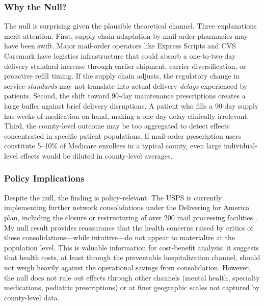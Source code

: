 \documentclass[12pt]{article}
\begin{document}
\subsubsection*{Why the Null?} The null is surprising given the plausible theoretical channel. Three explanations merit attention. First, supply-chain adaptation by mail-order pharmacies may have been swift. Major mail-order operators like Express Scripts and CVS Caremark have logistics infrastructure that could absorb a one-to-two-day delivery standard increase through earlier shipment, carrier diversification, or proactive refill timing. If the supply chain adjusts, the regulatory change in service \textit{standards} may not translate into actual delivery \textit{delays} experienced by patients. Second, the shift toward 90-day maintenance prescriptions creates a large buffer against brief delivery disruptions. A patient who fills a 90-day supply has weeks of medication on hand, making a one-day delay clinically irrelevant. Third, the county-level outcome may be too aggregated to detect effects concentrated in specific patient populations. If mail-order prescription users constitute 5--10\% of Medicare enrollees in a typical county, even large individual-level effects would be diluted in county-level averages.

\subsubsection*{Policy Implications} Despite the null, the finding is policy-relevant. The USPS is currently implementing further network consolidations under the Delivering for America plan, including the closure or restructuring of over 200 mail processing facilities \citep{usps2023network}. My null result provides reassurance that the health concerns raised by critics of these consolidations---while intuitive---do not appear to materialize at the population level. This is valuable information for cost-benefit analysis: it suggests that health costs, at least through the preventable hospitalization channel, should not weigh heavily against the operational savings from consolidation. However, the null does not rule out effects through other channels (mental health, specialty medications, pediatric prescriptions) or at finer geographic scales not captured by county-level data.
\end{document}
